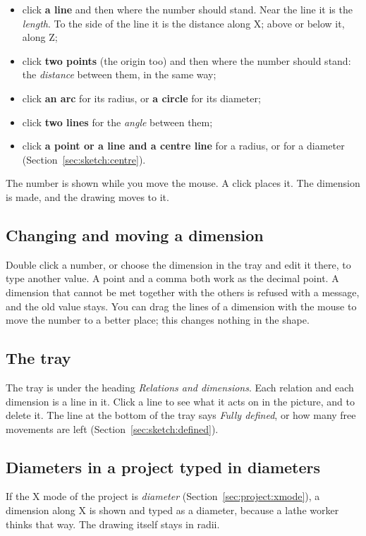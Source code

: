 \begin{itemize}
\item click \textbf{a line} and then where the number should stand. Near the line it is the \emph{length}. To the side of the line it is the distance along X; above or below it, along Z;
\item click \textbf{two points} (the origin too) and then where the number should stand: the \emph{distance} between them, in the same way;
\item click \textbf{an arc} for its radius, or \textbf{a circle} for its diameter;
\item click \textbf{two lines} for the \emph{angle} between them;
\item click \textbf{a point or a line and a centre line} for a radius, or for a diameter (Section~\ref{sec:sketch:centre}).
\end{itemize}

The number is shown while you move the mouse. A click places it. The dimension is made, and the drawing moves to it.

\subsection{Changing and moving a dimension}
Double click a number, or choose the dimension in the tray and edit it there, to type another value. A point and a comma both work as the decimal point. A dimension that cannot be met together with the others is refused with a message, and the old value stays. You can drag the lines of a dimension with the mouse to move the number to a better place; this changes nothing in the shape.


\subsection{The tray}\label{sec:sketch:tray}
The tray is under the heading \emph{Relations and dimensions}. Each relation and each dimension is a line in it. Click a line to see what it acts on in the picture, and  to delete it. The line at the bottom of the tray says \emph{Fully defined}, or how many free movements are left (Section~\ref{sec:sketch:defined}).

\subsection{Diameters in a project typed in diameters}
If the X mode of the project is \emph{diameter} (Section~\ref{sec:project:xmode}), a dimension along X is shown and typed as a diameter, because a lathe worker thinks that way. The drawing itself stays in radii.

